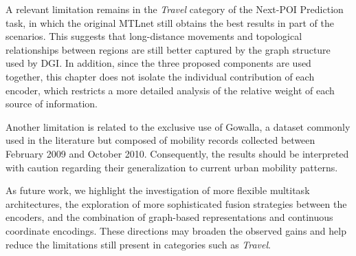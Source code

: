 A relevant limitation remains in the \textit{Travel} category of the Next-POI Prediction task, in which the original MTLnet still obtains the best results in part of the scenarios. This suggests that long-distance movements and topological relationships between regions are still better captured by the graph structure used by DGI. In addition, since the three proposed components are used together, this chapter does not isolate the individual contribution of each encoder, which restricts a more detailed analysis of the relative weight of each source of information.

Another limitation is related to the exclusive use of Gowalla, a dataset commonly used in the literature but composed of mobility records collected between February 2009 and October 2010. Consequently, the results should be interpreted with caution regarding their generalization to current urban mobility patterns.

As future work, we highlight the investigation of more flexible multitask architectures, the exploration of more sophisticated fusion strategies between the encoders, and the combination of graph-based representations and continuous coordinate encodings. These directions may broaden the observed gains and help reduce the limitations still present in categories such as \textit{Travel}.
